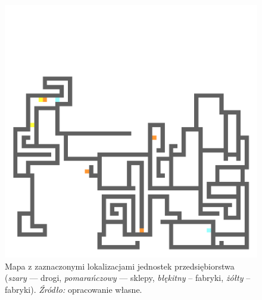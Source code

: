 \documentclass[polish, twoside, 12pt, a4paper]{article}
\theoremstyle{definition}
\theoremstyle{plain}
\theoremstyle{remark}
\begin{document}
\begin{figure}[hbt]
  \centering
    \includegraphics[width=\textwidth]{../mapy/firma.png}
  \captionsetup{margin=10pt,font=small,labelfont=bf,width=.8\textwidth}
  \caption[Mapa z zaznaczonymi lokalizacjami jednostek przedsiębiorstwa]{Mapa z zaznaczonymi lokalizacjami jednostek przedsiębiorstwa (\textit{szary} --- drogi, \textit{pomarańczowy} --- sklepy, \textit{błękitny} -- fabryki, \textit{żółty} -- fabryki). \textit{Źródło:} opracowanie własne.}\label{mapafirma}
\end{figure}
\end{document}
